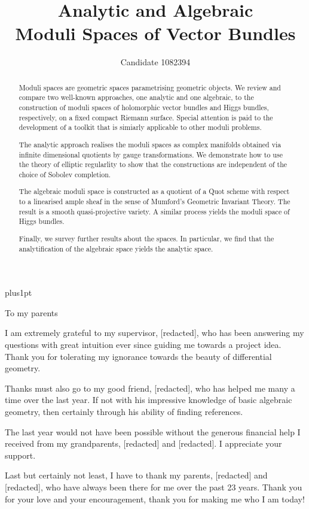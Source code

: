 \documentclass[12pt]{ociamthesis}  %
\title{Analytic and Algebraic\\[1ex]Moduli Spaces of Vector Bundles}   %
\author{Candidate 1082394}             %
\begin{document}
\baselineskip=18pt plus1pt

\setcounter{secnumdepth}{3}
\setcounter{tocdepth}{3}


\maketitle                  %
\begin{dedication}
  To my parents 
\end{dedication}

\begin{acknowledgements}
  I am extremely grateful to my supervisor, [redacted],
  who has been answering my questions with great intuition ever since
  guiding me towards a project idea. Thank you for tolerating my
  ignorance towards the beauty of differential geometry.

  Thanks must also go to my good friend, [redacted], who has
  helped me many a time over the last year. If not with his
  impressive knowledge of basic algebraic geometry, then certainly
  through his ability of finding references.

  The last year would not have been possible without the generous
  financial help I received from my grandparents, [redacted] and
  [redacted].  I appreciate your support.

  Last but certainly not least, I have to thank my parents,
  [redacted] and [redacted], who have always been there for
  me over the past 23 years. Thank you for your love and your
  encouragement, thank you for making me who I am today!
\end{acknowledgements}

\begin{abstract}
  Moduli spaces are geometric spaces parametrising geometric objects.  We review
  and compare two well-known approaches, one analytic and one algebraic, to the
  construction of moduli spaces of holomorphic vector bundles and Higgs bundles,
  respectively, on a fixed compact Riemann surface. Special attention
  is paid to the development of a toolkit that is simiarly applicable to
  other moduli problems.

  The analytic approach realises the moduli spaces as complex
  manifolds obtained via infinite dimensional quotients by gauge
  transformations. We demonstrate how to use the theory of elliptic
  regularlity to show that the constructions are independent
  of the choice of Sobolev completion.

  The algebraic moduli space is constructed as a quotient of a
  Quot scheme with respect to a linearised ample sheaf in the
  sense of Mumford's Geometric Invariant Theory. The result is a smooth
  quasi-projective variety. A similar process yields the moduli
  space of Higgs bundles.

  Finally, we survey further results about the spaces. In particular,
  we find that the analytification of the algebraic space yields the
  analytic space.
\end{abstract}
\end{document}
